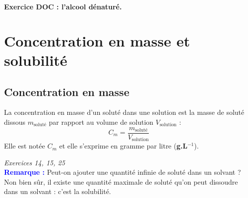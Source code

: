 \begin{Large}
\end{Large}\textbf{Exercice DOC : l'alcool dénaturé.}
\section{Concentration en masse et solubilité}
\subsection{Concentration en masse}
\begin{tcolorbox}[colback=green!5!white,colframe=green!75!black,title=\textbf{Définition}, upperbox=invisible]
La concentration en masse d’un soluté dans une 
solution est la masse de soluté dissous $m_{\text{soluté}}$ par rapport au volume de solution $V_{\text{solution}}$ :
\begin{equation*}
    C_m = \frac{m_{\text{soluté}}}{V_{\text{solution}}}
\end{equation*}
Elle est notée $C_m$ et elle s’exprime en gramme par litre (\textbf{g.L$^{-1}$}).
\end{tcolorbox}

\begin{Large}
\end{Large}\textit{Exercices 14, 15, 25}\\

\textcolor{blue}{\textbf{Remarque :}} Peut-on ajouter une quantité infinie de soluté dans un solvant ? Non bien sûr, il existe une quantité maximale de soluté qu'on peut dissoudre dans un solvant : c'est la solubilité.
